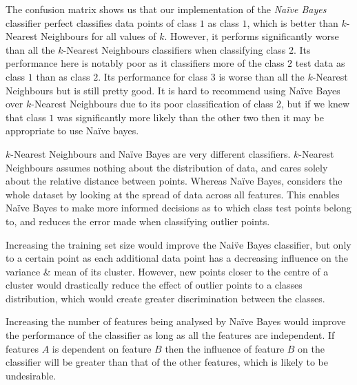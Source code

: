 \documentclass[11pt,a4paper]{article}
\begin{document}
The confusion matrix shows us that our implementation of the \textit{Na\"ive Bayes} classifier perfect classifies data points of class $1$ as class $1$, which is better than $k$-Nearest Neighbours for all values of $k$. However, it performs significantly worse than all the $k$-Nearest Neighbours classifiers when classifying class $2$. Its performance here is notably poor as it classifiers more of the class $2$ test data as class $1$ than as class $2$. Its performance for class $3$ is worse than all the $k$-Nearest Neighbours but is still pretty good. It is hard to recommend using Na\"ive Bayes over $k$-Nearest Neighbours due to its poor classification of class $2$, but if we knew that class $1$ was significantly more likely than the other two then it may be appropriate to use Na\"ive bayes.

\indent $k$-Nearest Neighbours and Na\"ive Bayes are very different classifiers. $k$-Nearest Neighbours assumes nothing about the distribution of data, and cares solely about the relative distance between points. Whereas Na\"ive Bayes, considers the whole dataset by looking at the spread of data across all features. This enables Na\"ive Bayes to make more informed decisions as to which class test points belong to, and reduces the error made when classifying outlier points.

\indent Increasing the training set size would improve the Nai\"ve Bayes classifier, but only to a certain point as each additional data point has a decreasing influence on the variance \& mean of its cluster. However, new points closer to the centre of a cluster would drastically reduce the effect of outlier points to a classes distribution, which would create greater discrimination between the classes.

\indent Increasing the number of features being analysed by Na\"ive Bayes would improve the performance of the classifier as long as all the features are independent. If features $A$ is dependent on feature $B$ then the influence of feature $B$ on the classifier will be greater than that of the other features, which is likely to be undesirable. 
\end{document}
